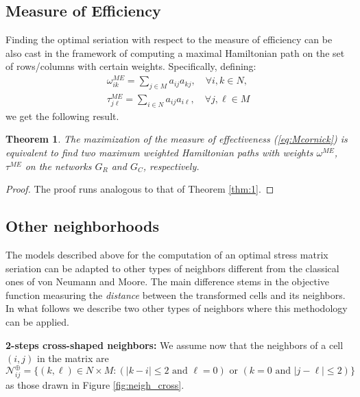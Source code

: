 \documentclass[a4paper,11pt, reqno]{amsart}
\newtheorem{thm}{Theorem}
\def\N{\mathcal{N}}
\begin{document}
\subsection{Measure of Efficiency}

Finding the optimal seriation with respect to the measure of efficiency can be also cast in the framework of computing a maximal Hamiltonian path on the set of rows/columns with certain weights. Specifically, defining:
    \begin{eqnarray*}
        \omega_{ik}^{ME} = \sum_{j\in M} a_{ij}a_{kj}, \quad \forall i,k\in N,\\
        \tau_{j\ell}^{ME}= \sum_{i\in N} a_{ij}a_{i\ell}, \quad \forall j,\ell\in M
    \end{eqnarray*}
we get the following result.
\begin{thm}
    The maximization of the measure of effectiveness  (\ref{eq:Mcornick}) is equivalent to find two maximum weighted Hamiltonian paths with weights $\omega^{ME}$, $\tau^{ME}$ on the networks $G_R$ and $G_C$, respectively.
\end{thm}
\begin{proof}
    The proof runs analogous  to that of Theorem \ref{thm:1}.
\end{proof}








\subsection{Other neighborhoods}

The models described above for the computation of an optimal stress matrix seriation can be adapted to other types of neighbors different from the classical ones of von Neumann and Moore. The main difference stems in the objective function measuring the \emph{distance} between the transformed cells and its neighbors. In what follows we describe two other types of neighbors where this methodology can be applied.

{\bf 2-steps cross-shaped neighbors: }  We assume now that the neighbors of a cell $(i,j)$ in the matrix are
$$
\N_{ij}^{\oplus} = \{(k,\ell) \in N \times M: (|k-i|\leq 2  \text{ and } \ell =0) \text{ or } (k =0 \text{ and } |j-\ell |\leq 2)\}
$$
as those drawn in Figure \ref{fig:neigh_cross}.
\end{document}

